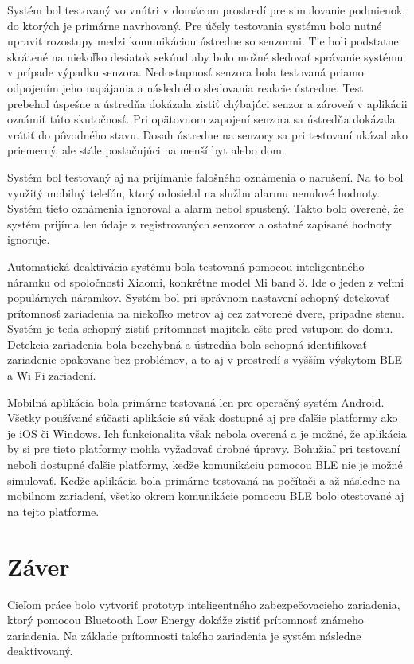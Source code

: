 Systém bol testovaný vo vnútri v domácom prostredí pre simulovanie podmienok, do ktorých je primárne navrhovaný. Pre účely testovania systému bolo nutné upraviť rozostupy medzi komunikáciou ústredne so senzormi. Tie boli podstatne skrátené na niekoľko desiatok sekúnd aby bolo možné sledovať správanie systému v prípade výpadku senzora. Nedostupnosť senzora bola testovaná priamo odpojením jeho napájania a následného sledovania reakcie ústredne. Test prebehol úspešne a ústredňa dokázala zistiť chýbajúci senzor a zároveň v aplikácii oznámiť túto skutočnosť. Pri opätovnom zapojení senzora sa ústredňa dokázala vrátiť do pôvodného stavu. Dosah ústredne na senzory sa pri testovaní ukázal ako priemerný, ale stále postačujúci na menší byt alebo dom.

Systém bol testovaný aj na prijímanie falošného oznámenia o narušení. Na to bol využitý mobilný telefón, ktorý odosielal na službu alarmu nenulové hodnoty. Systém tieto oznámenia ignoroval a alarm nebol spustený. Takto bolo overené, že systém prijíma len údaje z registrovaných senzorov a ostatné zapísané hodnoty ignoruje.

Automatická deaktivácia systému bola testovaná pomocou inteligentného náramku od spoločnosti Xiaomi, konkrétne model Mi band 3. Ide o jeden z veľmi populárnych náramkov. Systém bol pri správnom nastavení schopný detekovať prítomnosť zariadenia na niekoľko metrov aj cez zatvorené dvere, prípadne stenu. Systém je teda schopný zistiť prítomnosť majiteľa ešte pred vstupom do domu. Detekcia zariadenia bola bezchybná a ústredňa bola schopná identifikovať zariadenie opakovane bez problémov, a to aj v prostredí s vyšším výskytom BLE a Wi-Fi zariadení. 

Mobilná aplikácia bola primárne testovaná len pre operačný systém Android. Všetky používané súčasti aplikácie sú však dostupné aj pre ďalšie platformy ako je iOS či Windows. Ich funkcionalita však nebola overená a je možné, že aplikácia by si pre tieto platformy mohla vyžadovať drobné úpravy. Bohužiaľ pri testovaní neboli dostupné ďalšie platformy, keďže komunikáciu pomocou BLE nie je možné simulovať. Keďže aplikácia bola primárne testovaná na počítači a až následne na mobilnom zariadení, všetko okrem komunikácie pomocou BLE bolo otestované aj na tejto platforme. 


\chapter{Záver}

Cieľom práce bolo vytvoriť prototyp inteligentného zabezpečovacieho zariadenia, ktorý pomocou Bluetooth Low Energy dokáže zistiť prítomnosť známeho zariadenia. Na základe prítomnosti takého zariadenia je systém následne deaktivovaný.

